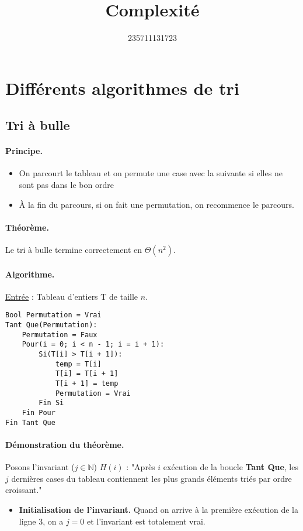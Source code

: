 \documentclass{article}
\title{Complexité}
\author{235711131723}
\begin{document}
    \maketitle

    \section{Différents algorithmes de tri}

    \subsection{Tri à bulle}

    \paragraph{Principe.}

    \begin{itemize}
        \item On parcourt le tableau et on permute une case avec la suivante si elles ne sont pas dans le bon ordre
        \item À la fin du parcours, si on fait une permutation, on recommence le parcours.
    \end{itemize}

    \paragraph{Théorème.} Le tri à bulle termine correctement en $\Theta(n^2)$.

    \paragraph{Algorithme.}

    \underline{Entrée} : Tableau d'entiers T de taille $n$.

    \begin{lstlisting}
Bool Permutation = Vrai
Tant Que(Permutation):
    Permutation = Faux
    Pour(i = 0; i < n - 1; i = i + 1):
        Si(T[i] > T[i + 1]):
            temp = T[i]
            T[i] = T[i + 1]
            T[i + 1] = temp
            Permutation = Vrai
        Fin Si
    Fin Pour
Fin Tant Que
    \end{lstlisting}

    \paragraph{Démonstration du théorème.}

    Posons l'invariant ($j \in \mathbb{N}$) $H(i)$ : "Après $i$ exécution de la boucle \textbf{Tant Que}, les $j$ dernières cases du tableau contiennent les plus grands éléments triés par ordre croissant."\\

    \begin{itemize}
        \item \textbf{Initialisation de l'invariant.} Quand on arrive à la première exécution de la ligne 3, on a $j = 0$ et l'invariant est totalement vrai.
    \end{itemize}
\end{document}
